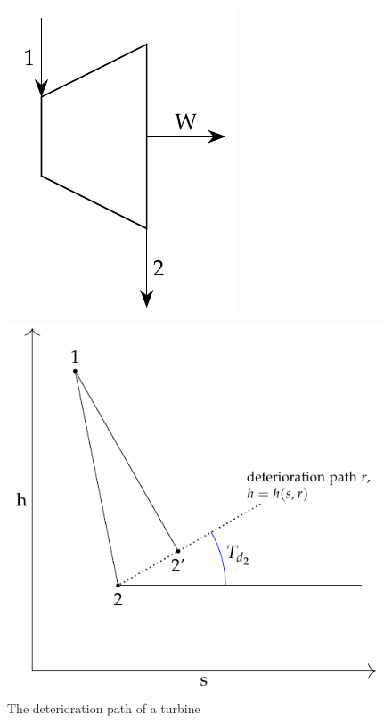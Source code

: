\documentclass[energies,article,submit,moreauthors,pdftex]{Definitions/mdpi}
\begin{document}
\begin{figure}[ht]
	\begin{minipage}[c]{0.48\linewidth}
		\centering
		\includegraphics[scale=0.8]{turbinew}
	\end{minipage}
	\begin{minipage}[c]{0.48\linewidth}
		\centering
		\includegraphics[scale=0.8]{dt1}
	\end{minipage}
	\caption{The deterioration path of a turbine}
	\label{fig:dt1}
\end{figure}
\end{document}
